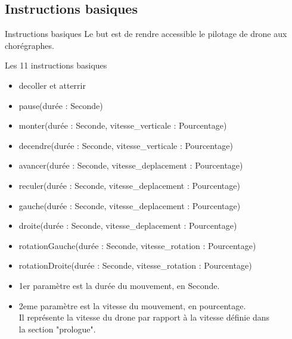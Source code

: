 \documentclass{bredelebeamer}
\begin{document}
	\subsection{Instructions basiques} 
\begin{frame}{Instructions basiques} 
Le but est de rendre accessible le pilotage de drone aux chorégraphes. 
\begin{block}{Les 11 instructions basiques}
\begin{itemize}
\item \alert{decoller} et \alert{atterrir}
\item \alert{pause(durée : Seconde)}
\item \alert{monter(durée : Seconde, vitesse\_verticale : Pourcentage)}
\item \alert{decendre(durée : Seconde, vitesse\_verticale : Pourcentage)}
\item \alert{avancer(durée : Seconde, vitesse\_deplacement : Pourcentage)}
\item \alert{reculer(durée : Seconde, vitesse\_deplacement : Pourcentage)}
\item \alert{gauche(durée : Seconde, vitesse\_deplacement : Pourcentage)}
\item \alert{droite(durée : Seconde, vitesse\_deplacement : Pourcentage)}
\item \alert{rotationGauche(durée : Seconde, vitesse\_rotation : Pourcentage)}
\item \alert{rotationDroite(durée : Seconde, vitesse\_rotation : Pourcentage)}
\end{itemize}
\end{block}
\begin{itemize}
\item 1er paramètre est la durée du mouvement, en Seconde.
\item 2eme paramètre est la vitesse du mouvement, en pourcentage. \\Il représente la vitesse du drone par rapport à  la vitesse définie dans \\la section "prologue".
\end{itemize}
\end{frame}
\end{document}
